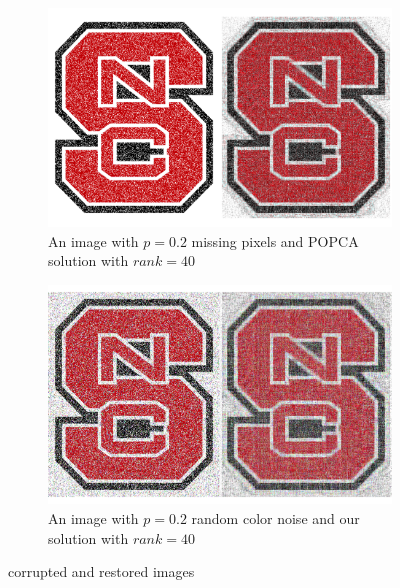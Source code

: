 \documentclass[12pt]{article}
\begin{document}
	\begin{figure}[!htbp]
		\centering
		
		\begin{subfigure}{.45\textwidth}
			\centering
			\includegraphics[width=\linewidth]{Missing}
			\caption{An image with $p = 0.2$ missing pixels and POPCA solution with $rank = 40$}
			\label{fig:missing}
		\end{subfigure}%
		\hfill
		\begin{subfigure}{.45\textwidth}
			\centering
			\includegraphics[width=\linewidth]{Color}
			\caption{An image with $p = 0.2$ random color noise and our solution with $rank = 40$}
			\label{fig:color}
		\end{subfigure}
		
		\caption{corrupted and restored images}
		\label{fig:badge}
	\end{figure}
	
\end{document}
